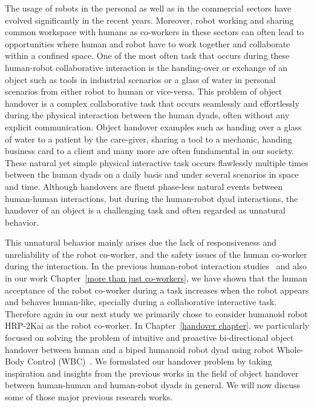 The usage of robots in the personal as well as in the commercial sectors have evolved significantly in the recent years. Moreover, robot working and sharing common workspace with humans as co-workers in these sectors can often lead to opportunities where human and robot have to work together and collaborate within a confined space. One of the most often task that occurs during these human-robot collaborative interaction is the handing-over or exchange of an object such as tools in industrial scenarios or a glass of water in personal scenarios from either robot to human or vice-versa. This problem of object handover is a complex collaborative task that occurs seamlessly and effortlessly during the physical interaction between the human dyads, often without any explicit communication.  Object handover examples such as handing over a glass of water to a patient by the care-giver, sharing a tool to a mechanic, handing business card to a client and many more are often fundamental in our society. These natural yet simple physical interactive task occurs flawlessly multiple times between the human dyads on a daily basis and under several scenarios in space and time. Although handovers are fluent phase-less natural events between human-human interactions, but during the human-robot dyad interactions, the handover of an object is a challenging task and often regarded as unnatural behavior. 

This unnatural behavior mainly arises due the lack of responsiveness and unreliability of the robot co-worker, and the safety issues of the human co-worker during the interaction. In the previous human-robot interaction studies~\cite{huber2008human, strabala2013toward, shibata1995experimental} and also in our work Chapter~\ref{more than just co-workers}, we have shown that the human acceptance of the robot co-worker during a task increases when the robot appears and behaves human-like, specially during a collaborative interactive task. Therefore again in our next study we primarily chose to consider humanoid robot HRP-2Kai as the robot co-worker. In Chapter~\ref{handover chapter}, we particularly focused on solving the problem of intuitive and proactive bi-directional object handover between human and a biped humanoid robot dyad using robot Whole-Body Control (WBC)~\cite{ladder-HRP-2Kai, bouyarmane2011using, sentis2006whole}. We formulated our handover problem by taking inspiration and insights from the previous works in the field of object handover between human-human and human-robot dyads in general. We will now discuss some of those major previous research works.

